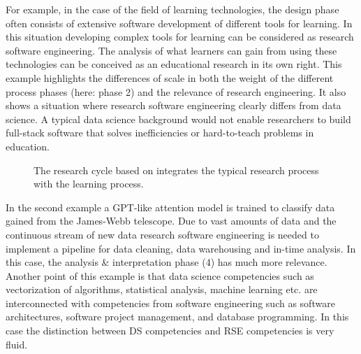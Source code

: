 \documentclass[
        english,biblatex
    ]{lni}
\begin{document}
    For example, in the case of the field of learning technologies, the
    design phase often consists of extensive software development of
    different tools for learning. In this situation developing complex
    tools for learning can be considered as research software
    engineering. The analysis of what learners can gain from using these
    technologies can be conceived as an educational research in its own
    right. This example highlights the differences of scale in both the
    weight of the different process phases (here: phase 2) and the
    relevance of research engineering. It also shows a situation where
    research software engineering clearly differs from data science. A
    typical data science background would not enable researchers to
    build full-stack software that solves inefficiencies or
    hard-to-teach problems in education.

    \begin{figure}[ht!]


    \caption{\label{fig-research_cycle}The research cycle based on
    \autocite{wildt2009forschendes} integrates the typical research
    process with the learning process.}

    \end{figure}%

    In the second example a GPT-like attention model is trained to
    classify data gained from the James-Webb telescope. Due to vast
    amounts of data and the continuous stream of new data research
    software engineering is needed to implement a pipeline for data
    cleaning, data warehousing and in-time analysis. In this case, the
    analysis \& interpretation phase (4) has much more relevance.
    Another point of this example is that data science competencies such
    as vectorization of algorithms, statistical analysis, machine
    learning etc. are interconnected with competencies from software
    engineering such as software architectures, software project
    management, and database programming. In this case the distinction
    between DS competencies and RSE competencies is very fluid.
\end{document}
